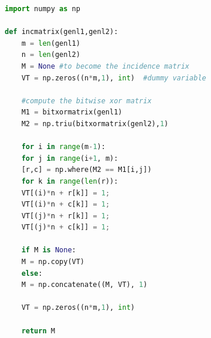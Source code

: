 \begin{lstlisting}[language=Python, caption=Python example]
import numpy as np

def incmatrix(genl1,genl2):
	m = len(genl1)
	n = len(genl2)
	M = None #to become the incidence matrix
	VT = np.zeros((n*m,1), int)  #dummy variable
	
	#compute the bitwise xor matrix
	M1 = bitxormatrix(genl1)
	M2 = np.triu(bitxormatrix(genl2),1) 
	
	for i in range(m-1):
	for j in range(i+1, m):
	[r,c] = np.where(M2 == M1[i,j])
	for k in range(len(r)):
	VT[(i)*n + r[k]] = 1;
	VT[(i)*n + c[k]] = 1;
	VT[(j)*n + r[k]] = 1;
	VT[(j)*n + c[k]] = 1;
	
	if M is None:
	M = np.copy(VT)
	else:
	M = np.concatenate((M, VT), 1)
	
	VT = np.zeros((n*m,1), int)
	
	return M
\end{lstlisting}

